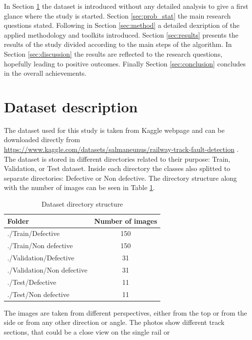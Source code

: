 \documentclass[10pt, final]{article}
\begin{document}
In Section \ref{sec:data_desc} the dataset is introduced without any detailed analysis
to give a first glance where the study is started.
Section \ref{sec:prob_stat} the main research questions stated.
Following in Section \ref{sec:method} a detailed dexription of the applied methodology
and toolkits introduced.
Section \ref{sec:results} presents the results of the study divided according to
the main steps of the algorithm.
In Section \ref{sec:discussion} the results are reflected to the research questions,
hopefully leading to positive outcomes.
Finally Section \ref{sec:conclusion} concludes in the overall achievements.

\section{Dataset description} \label{sec:data_desc}
The dataset used for this study is taken from Kaggle webpage \cite{noauthor_kaggle_nodate}
and can be downloaded directly from
\url{https://www.kaggle.com/datasets/salmaneunus/railway-track-fault-detection}
\cite{noauthor_railway_nodate}.
The dataset is stored in different directories related to their purpose: Train, Validation,
or Test dataset.
Inside each directory the classes also splitted to separate directories: Defective or Non defective.
The directory structure along with the number of images can be seen in Table \ref{table:dir_struct}.
\begin{table}[!ht]
	\centering
	\begin{tabular}{l c}
		Folder                     & Number of images \\
		\hline
		./Train/Defective          & 150              \\
		./Train/Non defective      & 150              \\
		./Validation/Defective     & 31               \\
		./Validation/Non defective & 31               \\
		./Test/Defective           & 11               \\
		./Test/Non defective       & 11               \\
		\hline
	\end{tabular}
	\caption{Dataset directory structure}
	\label{table:dir_struct}
\end{table}
The images are taken from different perspectives, either from the top or from the side or from
any other direction or angle.
The photos show different track sections, that could be a close view on the single rail or
\end{document}
